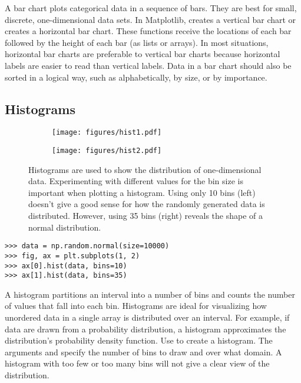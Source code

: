 A bar chart plots categorical data in a sequence of bars.
They are best for small, discrete, one-dimensional data sets.
In Matplotlib,  creates a vertical bar chart or  creates a horizontal bar chart.
These functions receive the locations of each bar followed by the height of each bar (as lists or arrays).
In most situations, horizontal bar charts are preferable to vertical bar charts because horizontal labels are easier to read than vertical labels.
Data in a bar chart should also be sorted in a logical way, such as alphabetically, by size, or by importance.

\subsection*{Histograms} %

\begin{figure}[H] %
    \centering
    \begin{subfigure}{.47\textwidth}
        \centering
        \texttt{[image: figures/hist1.pdf]}
    \end{subfigure}
    \begin{subfigure}{.47\textwidth}
        \centering
        \texttt{[image: figures/hist2.pdf]}
    \end{subfigure}
    \caption{Histograms are used to show the distribution of one-dimensional data. Experimenting with different values for the bin size is important when plotting a histogram. Using only 10 bins (left) doesn't give a good sense for how the randomly generated data is distributed. However, using 35 bins (right) reveals the shape of a normal distribution.}
\end{figure}

\begin{lstlisting}
>>> data = np.random.normal(size=10000)
>>> fig, ax = plt.subplots(1, 2)
>>> ax[0].hist(data, bins=10)
>>> ax[1].hist(data, bins=35)
\end{lstlisting}

A histogram partitions an interval into a number of bins and counts the number of values that fall into each bin.
Histograms are ideal for visualizing how unordered data in a single array is distributed over an interval.
For example, if data are drawn from a probability distribution, a histogram approximates the distribution's probability density function.
Use  to create a histogram.
The arguments  and  specify the number of bins to draw and over what domain.
A histogram with too few or too many bins will not give a clear view of the distribution.


